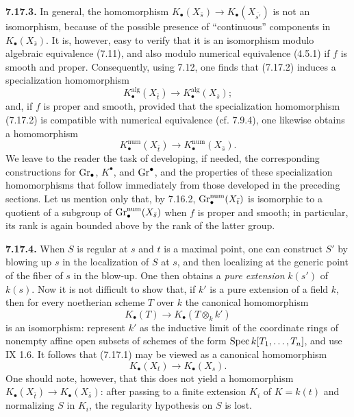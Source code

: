 \textbf{7.17.3.}
In general, the homomorphism
$K_\bullet(X_{\bar s})\to K_\bullet(X_{\overline{s'}})$ is not an
isomorphism, because of the possible presence of ``continuous'' components
in $K_\bullet(X_{\bar s})$. It is, however, easy to verify that it is an
isomorphism modulo algebraic equivalence (7.11), and also modulo numerical
equivalence (4.5.1) if $f$ is smooth and proper. Consequently, using 7.12,
one finds that (7.17.2) induces a specialization homomorphism
\begin{equation}\tag{7.17.3.1}
K_\bullet^{\mathrm{alg}}(X_{\bar t})
  \longrightarrow K_\bullet^{\mathrm{alg}}(X_{\bar s});
\end{equation}
and, if $f$ is proper and smooth, provided that the specialization
homomorphism (7.17.2) is compatible with numerical equivalence (cf. 7.9.4),
one likewise obtains a homomorphism
\begin{equation}\tag{7.17.3.2}
K_\bullet^{\mathrm{num}}(X_{\bar t})
  \longrightarrow K_\bullet^{\mathrm{num}}(X_{\bar s}).
\end{equation}
We leave to the reader the task of developing, if needed, the corresponding
constructions for $\operatorname{Gr}_\bullet$, $K^\bullet$, and $\operatorname{Gr}^\bullet$, and the
properties of these specialization homomorphisms that follow immediately
from those developed in the preceding sections. Let us mention only
that, by 7.16.2, $\operatorname{Gr}_\bullet^{\mathrm{num}}(X_{\bar t})$ is isomorphic to a
quotient of a subgroup of $\operatorname{Gr}_\bullet^{\mathrm{num}}(X_{\bar s})$ when $f$
is proper and smooth; in particular, its rank is again bounded above by the
rank of the latter group.

\textbf{7.17.4.}
When $S$ is regular at $s$ and $t$ is a maximal point, one can construct
$S'$ by
blowing up $s$ in the localization of $S$ at $s$, and then localizing at the
generic point of the fiber of $s$ in the blow-up. One then obtains a
\emph{pure extension} $k(s')$ of $k(s)$. Now it is not difficult to show
that, if $k'$ is a pure extension of a field $k$, then for every noetherian
scheme $T$ over $k$ the canonical homomorphism
\[
K_\bullet(T)\longrightarrow K_\bullet(T\otimes_k k')
\]
is an isomorphism: represent $k'$ as the inductive limit of the coordinate
rings of nonempty affine open subsets of schemes of the form
$\operatorname{Spec} k[T_1,\ldots,T_n]$, and use IX 1.6. It follows that (7.17.1) may be
viewed as a canonical homomorphism
\begin{equation}\tag{7.17.4.1}
K_\bullet(X_t)\longrightarrow K_\bullet(X_s).
\end{equation}
One should note, however, that this does not yield a homomorphism
$K_\bullet(X_{\bar t})\to K_\bullet(X_{\bar s})$: after passing to a finite
extension $K_i$ of $K=k(t)$ and normalizing $S$ in $K_i$, the regularity
hypothesis on $S$ is lost.

